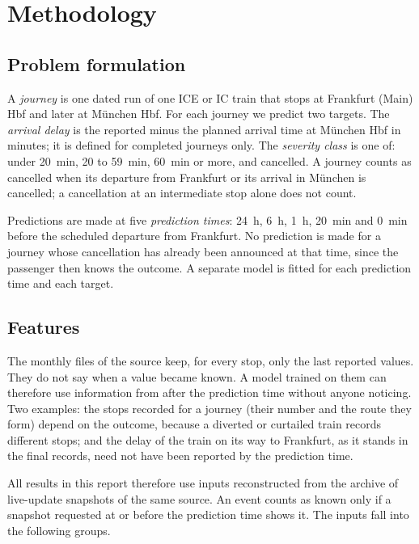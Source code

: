 \documentclass[conference]{IEEEtran}
\begin{document}
\section{Methodology}
\label{sec:method}

\subsection{Problem formulation}

A \emph{journey} is one dated run of one ICE or IC train that stops at Frankfurt (Main) Hbf and
later at M\"unchen Hbf. For each journey we predict two targets. The \emph{arrival delay} is the
reported minus the planned arrival time at M\"unchen Hbf in minutes; it is defined for completed
journeys only. The \emph{severity class} is one of: under 20~min, 20 to 59~min, 60~min or more, and
cancelled. A journey counts as cancelled when its departure from Frankfurt or its arrival in
M\"unchen is cancelled; a cancellation at an intermediate stop alone does not count.

Predictions are made at five \emph{prediction times}: 24~h, 6~h, 1~h, 20~min and 0~min before the
scheduled departure from Frankfurt. No prediction is made for a journey whose cancellation has
already been announced at that time, since the passenger then knows the outcome. A separate model is
fitted for each prediction time and each target.

\subsection{Features}
\label{sec:inputs}

The monthly files of the source keep, for every stop, only the last reported values. They do not say
when a value became known. A model trained on them can therefore use information from after the
prediction time without anyone noticing. Two examples: the stops recorded for a journey (their
number and the route they form) depend on the outcome, because a diverted or curtailed train records
different stops; and the delay of the train on its way to Frankfurt, as it stands in the final
records, need not have been reported by the prediction time.

All results in this report therefore use inputs reconstructed from the
archive of live-update snapshots of the same source. An event counts as known only if a snapshot
requested at or before the prediction time shows it. The inputs fall into the following groups.
\end{document}
